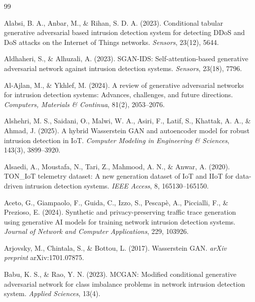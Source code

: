 \documentclass[11pt, a4paper]{article}
\begin{document}
\renewcommand{\refname}{References}
\begin{thebibliography}{99}
\setlength{\itemsep}{2pt}

Alabsi, B. A., Anbar, M., \& Rihan, S. D. A. (2023). Conditional tabular generative adversarial based intrusion detection system for detecting DDoS and DoS attacks on the Internet of Things networks. \textit{Sensors}, 23(12), 5644.

Aldhaheri, S., \& Alhuzali, A. (2023). SGAN-IDS: Self-attention-based generative adversarial network against intrusion detection systems. \textit{Sensors}, 23(18), 7796.

Al-Ajlan, M., \& Ykhlef, M. (2024). A review of generative adversarial networks for intrusion detection systems: Advances, challenges, and future directions. \textit{Computers, Materials \& Continua}, 81(2), 2053--2076.

Alshehri, M. S., Saidani, O., Malwi, W. A., Asiri, F., Latif, S., Khattak, A. A., \& Ahmad, J. (2025). A hybrid Wasserstein GAN and autoencoder model for robust intrusion detection in IoT. \textit{Computer Modeling in Engineering \& Sciences}, 143(3), 3899--3920.

Alsaedi, A., Moustafa, N., Tari, Z., Mahmood, A. N., \& Anwar, A. (2020). TON\_IoT telemetry dataset: A new generation dataset of IoT and IIoT for data-driven intrusion detection systems. \textit{IEEE Access}, 8, 165130--165150.

Aceto, G., Giampaolo, F., Guida, C., Izzo, S., Pescap\`{e}, A., Piccialli, F., \& Prezioso, E. (2024). Synthetic and privacy-preserving traffic trace generation using generative AI models for training network intrusion detection systems. \textit{Journal of Network and Computer Applications}, 229, 103926.

Arjovsky, M., Chintala, S., \& Bottou, L. (2017). Wasserstein GAN. \textit{arXiv preprint} arXiv:1701.07875.

Babu, K. S., \& Rao, Y. N. (2023). MCGAN: Modified conditional generative adversarial network for class imbalance problems in network intrusion detection system. \textit{Applied Sciences}, 13(4).


\end{thebibliography}
\end{document}
